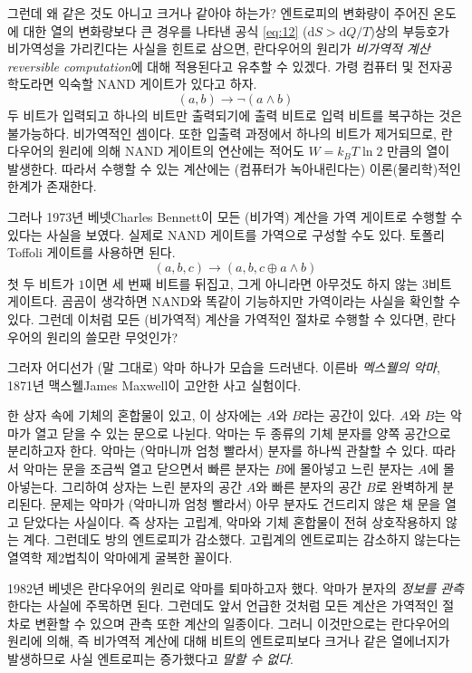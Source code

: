 \documentclass[a4paper,chapter,atbegshi]{oblivoir}
\begin{document}
그런데 왜 같은 것도 아니고 크거나 같아야 하는가? 엔트로피의 변화량이 주어진 온도에
대한 열의 변화량보다 큰 경우를 나타낸 공식 \ref{eq:12} ($\textrm{d}S>
\textrm{d}Q/T$)상의 부등호가 비가역성을 가리킨다는 사실을 힌트로 삼으면,
란다우어의 원리가 \emph{비가역적 계산\tiny reversible computation}에 대해 
적용된다고 유추할 수 있겠다. 가령 컴퓨터 및 전자공학도라면 익숙할 NAND 게이트가
있다고 하자. 
\[
  (a,b) \rightarrow \neg(a \wedge b)
\]
두 비트가 입력되고 하나의 비트만 출력되기에 출력 비트로 입력 비트를 복구하는
것은 불가능하다. 비가역적인 셈이다. 또한 입출력 과정에서 하나의 비트가 제거되므로,
란다우어의 원리에 의해 NAND 게이트의 연산에는 적어도 $W=k_BT\ln2$ 만큼의 열이
발생한다. 따라서 수행할 수 있는 계산에는 (컴퓨터가 녹아내린다는) 이론(물리학)적인
한계가 존재한다. 

그러나 1973년 베넷{\tiny Charles Bennett}이 모든 (비가역) 계산을 가역 게이트로
수행할 수 있다는 사실을 보였다. 실제로 NAND 게이트를 가역으로 구성할 
수도 있다. 토폴리{\tiny Toffoli} 게이트를 사용하면 된다. 
\[
  (a,b,c)\rightarrow(a,b,c\oplus a \wedge b)
\]
첫 두 비트가 $1$이면 세 번째 비트를 뒤집고, 그게 아니라면 아무것도
하지 않는 $3$비트 게이트다. 곰곰이 생각하면 NAND와 똑같이 기능하지만 가역이라는
사실을 확인할 수 있다. 그런데 이처럼 모든 (비가역적) 계산을 가역적인 절차로
수행할 수 있다면, 란다우어의 원리의 쓸모란 무엇인가? 

그러자 어디선가 (말 그대로) 악마 하나가 모습을 드러낸다. 이른바 
\emph{멕스웰의 악마}, 1871년 맥스웰{\tiny James Maxwell}이 고안한 사고 실험이다. 

한 상자 속에 기체의 혼합물이 있고, 이 상자에는 $A$와 $B$라는 공간이 있다.
$A$와 $B$는 악마가 열고 닫을 수 있는 문으로 나뉜다. 악마는 두 종류의 기체 분자를
양쪽 공간으로 분리하고자 한다. 악마는 (악마니까 엄청 빨라서) 분자를 하나씩 관찰할
수 있다. 따라서 악마는 문을 조금씩 열고 닫으면서 빠른 분자는 $B$에 몰아넣고 느린
분자는 $A$에 몰아넣는다. 그리하여 상자는 느린 분자의 공간 $A$와 빠른 분자의 공간
$B$로 완벽하게 분리된다. 문제는 악마가 (악마니까 엄청 빨라서) 아무 분자도
건드리지 않은 채 문을 열고 닫았다는 사실이다. 즉 상자는 고립계, 악마와 기체
혼합물이 전혀 상호작용하지 않는 계다. 그런데도 방의 엔트로피가 감소했다.
고립계의 엔트로피는 감소하지 않는다는 열역학 제2법칙이 악마에게 굴복한 꼴이다. 

1982년 베넷은 란다우어의 원리로 악마를 퇴마하고자 했다. 악마가 분자의
\emph{정보를 관측}한다는 사실에 주목하면 된다. 그런데도 앞서 언급한 것처럼 모든
계산은 가역적인 절차로 변환할 수 있으며 관측 또한 계산의 일종이다. 그러니 
이것만으로는 란다우어의 원리에 의해, 즉 비가역적 계산에 대해 비트의 엔트로피보다
크거나 같은 열에너지가 발생하므로 사실 엔트로피는 증가했다고 \emph{말할 수 없다}.
\end{document}
